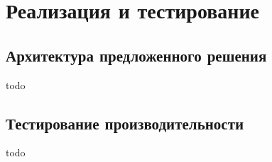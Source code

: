 \section{Реализация и тестирование}

\subsection{Архитектура предложенного решения}
todo

\subsection{Тестирование производительности}
todo